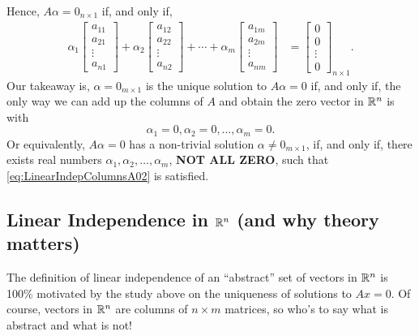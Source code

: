 Hence, $A\alpha = 0_{n \times 1}$ if, and only if, 
\begin{equation}
    \label{eq:LinearIndepColumnsA02}
    \begin{aligned}
\alpha_1 \begin{bmatrix} a_{11} \\ a_{21}\\ \vdots \\ a_{n1} \end{bmatrix}  + \alpha_2  \begin{bmatrix} a_{12} \\ a_{22}\\ \vdots \\ a_{n2} \end{bmatrix}  + \cdots + \alpha_m \begin{bmatrix} a_{1m} \\ a_{2m}\\ \vdots \\ a_{nm} \end{bmatrix} & = \begin{bmatrix} 0 \\ 0\\ \vdots \\ 0 \end{bmatrix}_{n \times 1}.
    \end{aligned}
\end{equation}
Our takeaway is, $\alpha = 0_{m \times 1}$ is the unique solution to $A\alpha=0$ if, and only if, the only way we can add up the columns of $A$ and obtain the zero vector in $\mathbb R^n$ is with 
$$\alpha_1=0, \alpha_2=0, \ldots, \alpha_m=0. $$
Or equivalently, $A\alpha = 0$ has a non-trivial solution $\alpha \neq 0_{m \times 1}$, if, and only if, there exists real numbers $\alpha_1, \alpha_2, \ldots, \alpha_m$, \textbf{NOT ALL ZERO}, such that \eqref{eq:LinearIndepColumnsA02} is satisfied.

\subsection{Linear Independence in $\mathbb R^n$ (and why theory matters)}

The definition of linear independence of an ``abstract'' set of vectors in $\mathbb R^n$ is 100\% motivated by the study above on the uniqueness of solutions to $Ax=0.$ Of course, vectors in $\mathbb R^n$ are columns of $n \times m$ matrices, so who's to say what is abstract and what is not!

\vspace*{0.5cm}

